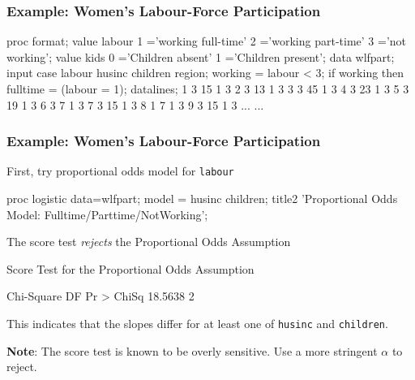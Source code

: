 \begin{frame}[fragile]
  \frametitle{Example: Women's Labour-Force Participation}
\begin{Input}[label=\fbox{\texttt{wlfpart.sas}},baselinestretch=0.8]
proc format;
   value labour    
      1 ='working full-time'  2 ='working part-time'
      3 ='not working';
   value kids      
      0 ='Children absent'  1 ='Children present';
data wlfpart;
   input case labour husinc children region;
   working = labour < 3;
   if working then
      fulltime = (labour = 1);
datalines;
  1  3  15  1  3
  2  3  13  1  3
  3  3  45  1  3
  4  3  23  1  3
  5  3  19  1  3
  6  3   7  1  3
  7  3  15  1  3
  8  1   7  1  3
  9  3  15  1  3
  ...  ...
\end{Input}
\end{frame}

\begin{frame}[fragile]
  \frametitle{Example: Women's Labour-Force Participation}
First, try proportional odds model for \texttt{labour}

\begin{Input}[fontsize=\small]
proc logistic data=wlfpart;
   model   = husinc children;
   title2 'Proportional Odds Model: Fulltime/Parttime/NotWorking';
\end{Input}
The score test \emph{rejects} the Proportional Odds Assumption
\begin{Output}[gobble=6]
                 Score Test for the Proportional Odds Assumption
 
                       Chi-Square       DF     Pr > ChiSq
                          18.5638        2         
\end{Output}
This indicates that the slopes differ for at least one of \texttt{husinc}
and \texttt{children}.

\textbf{Note}: The score test is known to be overly sensitive. 
Use a more stringent $\alpha$ to reject.
\end{frame}

